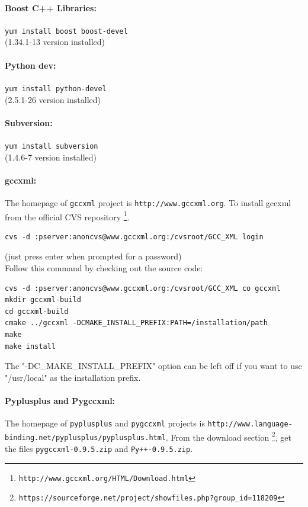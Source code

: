 \documentclass[12pt,a4paper]{article}
\begin{document}
\paragraph{Boost C++ Libraries:} {\tt yum install boost boost-devel} \\
(1.34.1-13 version installed)


\paragraph{Python dev:} {\tt yum install python-devel} \\
(2.5.1-26 version installed)

\paragraph{Subversion:} {\tt yum install subversion} \\
(1.4.6-7 version installed)

\paragraph{gccxml:}The homepage of {\tt gccxml} project is {\tt http://www.gccxml.org}. 
To install gccxml from the official CVS repository \footnote{\tt http://www.gccxml.org/HTML/Download.html}.

\begin{verbatim}
cvs -d :pserver:anoncvs@www.gccxml.org:/cvsroot/GCC_XML login
\end{verbatim}
(just press enter when prompted for a password)\\
Follow this command by checking out the source code:
\begin{verbatim}
cvs -d :pserver:anoncvs@www.gccxml.org:/cvsroot/GCC_XML co gccxml
mkdir gccxml-build
cd gccxml-build
cmake ../gccxml -DCMAKE_INSTALL_PREFIX:PATH=/installation/path
make
make install
\end{verbatim}
The "-DC\_MAKE\_INSTALL\_PREFIX" option can be left off if you want to use "/usr/local" as the installation prefix.


\paragraph{Pyplusplus and Pygccxml: }
The homepage of {\tt pyplusplus} and {\tt pygccxml} projects is 
{\tt http://www.language-binding.net/pyplusplus/pyplusplus.html}. From the
download section \footnote{\tt https://sourceforge.net/project/showfiles.php?group\_id=118209}, 
get the files {\tt pygccxml-0.9.5.zip} and {\tt Py++-0.9.5.zip}.
\end{document}
